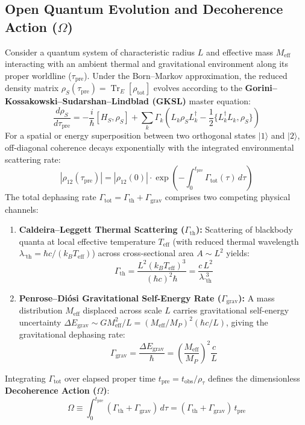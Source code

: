 \documentclass[11pt,a4paper]{article}
\begin{document}
\subsection{Open Quantum Evolution and Decoherence Action ($\Omega$)}
Consider a quantum system of characteristic radius $L$ and effective mass $M_{\mathrm{eff}}$ interacting with an ambient thermal and gravitational environment along its proper worldline ($\tau_{\mathrm{pre}}$). Under the Born--Markov approximation, the reduced density matrix $\rho_S(\tau_{\mathrm{pre}}) = \operatorname{Tr}_E[\rho_{\mathrm{tot}}]$ evolves according to the \textbf{Gorini--Kossakowski--Sudarshan--Lindblad (GKSL)} master equation:
\begin{equation}
\frac{d\rho_S}{d\tau_{\mathrm{pre}}} = -\frac{i}{\hbar}[H_S, \rho_S] + \sum_k \Gamma_k \left( L_k \rho_S L_k^\dagger - \frac{1}{2}\{L_k^\dagger L_k, \rho_S\} \right)
\end{equation}
For a spatial or energy superposition between two orthogonal states $|1\rangle$ and $|2\rangle$, off-diagonal coherence decays exponentially with the integrated environmental scattering rate:
\begin{equation}
|\rho_{12}(\tau_{\mathrm{pre}})| = |\rho_{12}(0)| \cdot \exp\left(-\int_0^{t_{\mathrm{pre}}} \Gamma_{\mathrm{tot}}(\tau)\,d\tau\right)
\end{equation}
The total dephasing rate $\Gamma_{\mathrm{tot}} = \Gamma_{\mathrm{th}} + \Gamma_{\mathrm{grav}}$ comprises two competing physical channels:
\begin{enumerate}
\item \textbf{Caldeira--Leggett Thermal Scattering ($\Gamma_{\mathrm{th}}$):} Scattering of blackbody quanta at local effective temperature $T_{\mathrm{eff}}$ (with reduced thermal wavelength $\lambda\!\!\!\bar{}_{\mathrm{th}} = \hbar c / (k_B T_{\mathrm{eff}})$) across cross-sectional area $A \sim L^2$ yields:
\begin{equation}
\Gamma_{\mathrm{th}} = \frac{L^2 (k_B T_{\mathrm{eff}})^3}{(\hbar c)^2 \hbar} = \frac{c\,L^2}{\lambda\!\!\!\bar{}_{\mathrm{th}}^3}
\end{equation}
\item \textbf{Penrose--Di\'{o}si Gravitational Self-Energy Rate ($\Gamma_{\mathrm{grav}}$):} A mass distribution $M_{\mathrm{eff}}$ displaced across scale $L$ carries gravitational self-energy uncertainty $\Delta E_{\mathrm{grav}} \sim G M_{\mathrm{eff}}^2 / L = (M_{\mathrm{eff}}/M_P)^2 (\hbar c / L)$, giving the gravitational dephasing rate:
\begin{equation}
\Gamma_{\mathrm{grav}} = \frac{\Delta E_{\mathrm{grav}}}{\hbar} = \left(\frac{M_{\mathrm{eff}}}{M_P}\right)^2 \frac{c}{L}
\end{equation}
\end{enumerate}
Integrating $\Gamma_{\mathrm{tot}}$ over elapsed proper time $t_{\mathrm{pre}} = t_{\mathrm{obs}} / \rho_\tau$ defines the dimensionless \textbf{Decoherence Action ($\Omega$)}:
\begin{equation}
\Omega \equiv \int_0^{t_{\mathrm{pre}}} (\Gamma_{\mathrm{th}} + \Gamma_{\mathrm{grav}})\,d\tau = (\Gamma_{\mathrm{th}} + \Gamma_{\mathrm{grav}})\,t_{\mathrm{pre}}
\end{equation}
\end{document}
